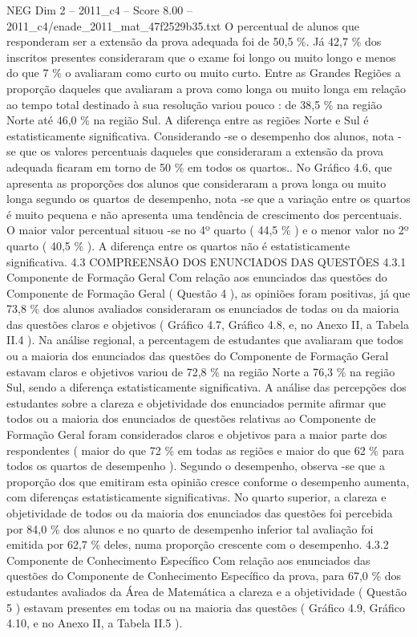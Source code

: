 \begin{textsample}{NEG Dim 2 – 2011\_c4 – Score 8.00 – 2011\_c4/enade\_2011\_mat\_47f2529b35.txt}
O percentual de alunos que responderam ser a extensão da prova adequada foi de 50,5 \%.
Já 42,7 \% dos inscritos presentes consideraram que o exame foi longo ou muito longo e menos do que 7 \% o avaliaram como curto ou muito curto.
Entre as Grandes Regiões a proporção daqueles que avaliaram a prova como longa ou muito longa em relação ao tempo total destinado à sua resolução variou pouco : de 38,5 \% na região Norte até 46,0 \% na região Sul.
A diferença entre as regiões Norte e Sul é estatisticamente significativa.
Considerando -se o desempenho dos alunos, nota -se que os valores percentuais daqueles que consideraram a extensão da prova adequada ficaram em torno de 50 \% em todos os quartos..
No Gráfico 4.6, que apresenta as proporções dos alunos que consideraram a prova longa ou muito longa segundo os quartos de desempenho, nota -se que a variação entre os quartos é muito pequena e não apresenta uma tendência de crescimento dos percentuais.
O maior valor percentual situou -se no 4º quarto ( 44,5 \% ) e o menor valor no 2º quarto ( 40,5 \% ).
A diferença entre os quartos não é estatisticamente significativa. 4.3 COMPREENSÃO DOS ENUNCIADOS DAS QUESTÕES 4.3.1 Componente de Formação Geral Com relação aos enunciados das questões do Componente de Formação Geral ( Questão 4 ), as opiniões foram positivas, já que 73,8 \% dos alunos avaliados consideraram os enunciados de todas ou da maioria das questões claros e objetivos ( Gráfico 4.7, Gráfico 4.8, e, no Anexo II, a Tabela II.4 ).
Na análise regional, a percentagem de estudantes que avaliaram que todos ou a maioria dos enunciados das questões do Componente de Formação Geral estavam claros e objetivos variou de 72,8 \% na região Norte a 76,3 \% na região Sul, sendo a diferença estatisticamente significativa.
A análise das percepções dos estudantes sobre a clareza e objetividade dos enunciados permite afirmar que todos ou a maioria dos enunciados de questões relativas ao Componente de Formação Geral foram considerados claros e objetivos para a maior parte dos respondentes ( maior do que 72 \% em todas as regiões e maior do que 62 \% para todos os quartos de desempenho ).
Segundo o desempenho, observa -se que a proporção dos que emitiram esta opinião cresce conforme o desempenho aumenta, com diferenças estatisticamente significativas.
No quarto superior, a clareza e objetividade de todos ou da maioria dos enunciados das questões foi percebida por 84,0 \% dos alunos e no quarto de desempenho inferior tal avaliação foi emitida por 62,7 \% deles, numa proporção crescente com o desempenho. 4.3.2 Componente de Conhecimento Específico Com relação aos enunciados das questões do Componente de Conhecimento Específico da prova, para 67,0 \% dos estudantes avaliados da Área de Matemática a clareza e a objetividade ( Questão 5 ) estavam presentes em todas ou na maioria das questões ( Gráfico 4.9, Gráfico 4.10, e no Anexo II, a Tabela II.5 ).

\end{textsample}
